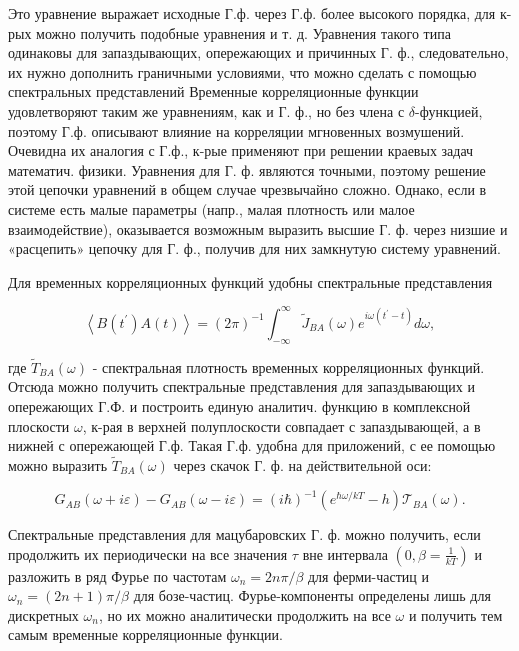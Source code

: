 \documentclass[10pt]{article}
\begin{document}
Это уравнение выражает исходные Г.ф. через Г.ф. более высокого порядка, для к-рых можно получить подобные уравнения и т. д. Уравнения такого типа одинаковы для запаздывающих, опережающих и причинных Г. ф., следовательно, их нужно дополнить граничными условиями, что можно сделать с помощью спектральных представлений Временные корреляционные функции удовлетворяют таким же уравнениям, как и Г. ф., но без члена с $\delta$-функцией, поэтому Г.ф. описывают влияние на корреляции мгновенных возмушений. Очевидна их аналогия с Г.ф., к-рые применяют при решении краевых задач математич. физики. Уравнения для Г. ф. являются точными, поэтому решение этой цепочки уравнений в общем случае чрезвычайно сложно. Однако, если в системе есть малые параметры (напр., малая плотность или малое взаимодействие), оказывается возможным выразить высшие Г. ф. через низшие и «расцепить» цепочку для Г. ф., получив для них замкнутую систему уравнений.



Для временных корреляционных функций удобны спектральные представления



\[

\left\langle B\left(t^{\prime}\right) A(t)\right\rangle=(2 \pi)^{-1} \int_{-\infty}^{\infty} \widetilde{J}_{B A}(\omega) e^{i \omega\left(t^{\prime}-t\right)} d \omega,

\]



где $\widetilde{T}_{B A}(\omega)$ - спектральная плотность временных корреляционных функций. Отсюда можно получить спектральные представления для запаздывающих и опережающих Г.Ф. и построить единую аналитич. функцию в комплексной плоскости $\omega$, к-рая в верхней полуплоскости совпадает с запаздывающей, а в нижней с опережающей Г.ф. Такая Г.ф. удобна для приложений, с ее помощью можно выразить $\widetilde{T}_{B A}(\omega)$ через скачок Г. ф. на действительной оси:



\[

G_{A B}(\omega+i \varepsilon)-G_{A B}(\omega-i \varepsilon)=(i \hbar)^{-1}\left(e^{\hbar \omega / k T}-h\right) \mathscr{T}_{B A}(\omega) .

\]



Спектральные представления для мацубаровских Г. ф. можно получить, если продолжить их периодически на все значения $\tau$ вне интервала $\left(0, \beta=\frac{1}{k T}\right)$ и разложить в ряд Фурье по частотам $\omega_{n}=2 n \pi / \beta$ для ферми-частиц и $\omega_{n}=(2 n+1) \pi / \beta$ для бозе-частиц. Фурье-компоненты определены лишь для дискретных $\omega_{n}$, но их можно аналитически продолжить на все $\omega$ и получить тем самым временные корреляционные функции.
\end{document}
